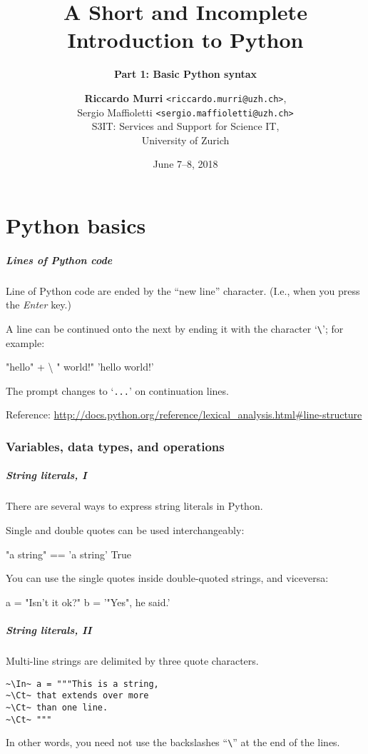 \documentclass[english,serif,mathserif,xcolor=pdftex,dvipsnames,table]{beamer}
\title[1. Basics]{%
  A Short and Incomplete Introduction to Python
}
\subtitle{\bfseries Part 1: Basic Python syntax}
\author[R.~Murri]{%
  \textbf{Riccardo Murri} \texttt{<riccardo.murri@uzh.ch>}, \\
  Sergio Maffioletti \texttt{<sergio.maffioletti@uzh.ch>}
  \\
  S3IT: Services and Support for Science IT,
  \\
  University of Zurich
}
\date{June 7--8, 2018}
\begin{document}
\maketitle

\part{Python basics}

\begin{frame}[fragile]
  \frametitle{Lines of Python code}
  Line of Python code are ended by the ``new line'' character. (I.e., when you
  press the \emph{Enter} key.)

  \+
  A line can be continued onto the next by ending it with the
  character `\texttt{\textbackslash}'; for example:
\begin{semiverbatim}
\In "hello" + \textbackslash
\Ct " world!"
\Out 'hello world!'
\end{semiverbatim}
  The prompt changes to `\texttt{...}' on continuation lines.

  \+\scriptsize
  Reference:
  \url{http://docs.python.org/reference/lexical_analysis.html#line-structure}
\end{frame}


\section{Variables, data types, and operations}

\begin{frame}[fragile]
  \frametitle{String literals, I}
  There are several ways to express string literals in Python.

  \+
  Single and double quotes can be used interchangeably:
\begin{semiverbatim}
\In "a string" == 'a string'
\Out True
\end{semiverbatim}

  \+
  You can use the single quotes inside double-quoted strings, and viceversa:
\begin{semiverbatim}
\In a = "Isn't it ok?"
\In b = '"Yes", he said.'
\end{semiverbatim}
\end{frame}


\begin{frame}[fragile]
  \frametitle{String literals, II}
  Multi-line strings are delimited by three quote characters.
\begin{lstlisting}[showstringspaces=false]
~\In~ a = """This is a string,
~\Ct~ that extends over more
~\Ct~ than one line.
~\Ct~ """
\end{lstlisting}

  \+ In other words, you need not use the backslashes
  ``\texttt{\textbackslash}'' at the end of the lines.
\end{frame}
\end{document}
